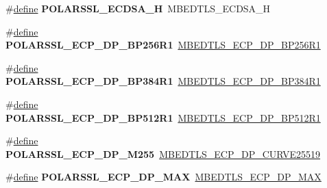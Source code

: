 \begin{DoxyCompactItemize}
\mbox{\label{compat-1_83_8h_a8f708bc7fafe0999f7ea57944c3e9e02}} 
\#\hyperlink{structdefine}{define} {\bfseries P\+O\+L\+A\+R\+S\+S\+L\+\_\+\+E\+C\+D\+S\+A\+\_\+H}~M\+B\+E\+D\+T\+L\+S\+\_\+\+E\+C\+D\+S\+A\+\_\+H
\item 
\mbox{\label{compat-1_83_8h_a04aeee4b9a9a4a6d17e289caf8b5a213}} 
\#\hyperlink{structdefine}{define} {\bfseries P\+O\+L\+A\+R\+S\+S\+L\+\_\+\+E\+C\+P\+\_\+\+D\+P\+\_\+\+B\+P256\+R1}~\hyperlink{ecp_8h_af79e530ea8f8416480f805baa20b1a2dade9d3762e81c6e1d6e499d21e8190be5}{M\+B\+E\+D\+T\+L\+S\+\_\+\+E\+C\+P\+\_\+\+D\+P\+\_\+\+B\+P256\+R1}
\item 
\mbox{\label{compat-1_83_8h_aff5999809615fe656c46b97438021f35}} 
\#\hyperlink{structdefine}{define} {\bfseries P\+O\+L\+A\+R\+S\+S\+L\+\_\+\+E\+C\+P\+\_\+\+D\+P\+\_\+\+B\+P384\+R1}~\hyperlink{ecp_8h_af79e530ea8f8416480f805baa20b1a2daaf562eeec4368f2c501c163b4707900a}{M\+B\+E\+D\+T\+L\+S\+\_\+\+E\+C\+P\+\_\+\+D\+P\+\_\+\+B\+P384\+R1}
\item 
\mbox{\label{compat-1_83_8h_a0c0802a0db6c27e255690dcf88ae3e0a}} 
\#\hyperlink{structdefine}{define} {\bfseries P\+O\+L\+A\+R\+S\+S\+L\+\_\+\+E\+C\+P\+\_\+\+D\+P\+\_\+\+B\+P512\+R1}~\hyperlink{ecp_8h_af79e530ea8f8416480f805baa20b1a2da803c5f7c0d68be4556a688746be1c9e1}{M\+B\+E\+D\+T\+L\+S\+\_\+\+E\+C\+P\+\_\+\+D\+P\+\_\+\+B\+P512\+R1}
\item 
\mbox{\label{compat-1_83_8h_a5536bb2785ec8ce051d7723a1f14f6ad}} 
\#\hyperlink{structdefine}{define} {\bfseries P\+O\+L\+A\+R\+S\+S\+L\+\_\+\+E\+C\+P\+\_\+\+D\+P\+\_\+\+M255}~\hyperlink{ecp_8h_af79e530ea8f8416480f805baa20b1a2da675f95c8d8550edd7eb85828d2f22b9f}{M\+B\+E\+D\+T\+L\+S\+\_\+\+E\+C\+P\+\_\+\+D\+P\+\_\+\+C\+U\+R\+V\+E25519}
\item 
\mbox{\label{compat-1_83_8h_a360bfb37c5abe58d6153f1e16936ea92}} 
\#\hyperlink{structdefine}{define} {\bfseries P\+O\+L\+A\+R\+S\+S\+L\+\_\+\+E\+C\+P\+\_\+\+D\+P\+\_\+\+M\+AX}~\hyperlink{ecp_8h_afef3986789abe96859bafe73485adb80}{M\+B\+E\+D\+T\+L\+S\+\_\+\+E\+C\+P\+\_\+\+D\+P\+\_\+\+M\+AX}
\item 
\mbox{\label{compat-1_83_8h_a49ce4ccafe934f53866d79e048965ef8}} 

\end{DoxyCompactItemize}
